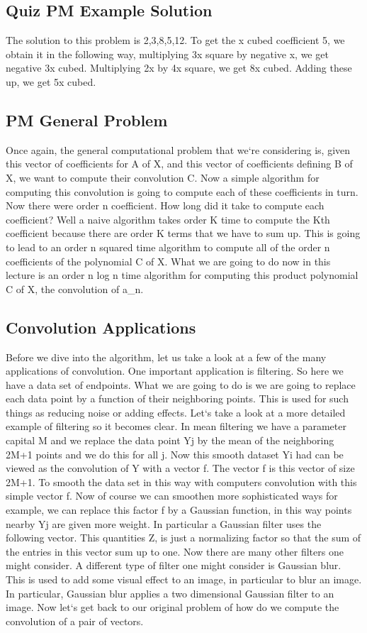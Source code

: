 \subsection{Quiz  PM  Example Solution}
The solution to this problem is 2,3,8,5,12.
To get the x cubed coefficient 5, we obtain it in the following way, multiplying 3x square by negative x, we get negative 3x cubed.
Multiplying 2x by 4x square, we get 8x cubed.
Adding these up, we get 5x cubed.

\subsection{PM  General Problem}
Once again, the general computational problem that we`re considering is, given this vector of coefficients for A of X, and this vector of coefficients defining B of X, we want to compute their convolution C\@.
Now a simple algorithm for computing this convolution is going to compute each of these coefficients in turn.
Now there were order n coefficient.
How long did it take to compute each coefficient? Well a naive algorithm takes order K time to compute the Kth coefficient because there are order K terms that we have to sum up.
This is going to lead to an order n squared time algorithm to compute all of the order n coefficients of the polynomial C of X\@.
What we are going to do now in this lecture is an order n log n time algorithm for computing this product polynomial C of X, the convolution of a\_n.

\subsection{Convolution Applications}
Before we dive into the algorithm, let us take a look at a few of the many applications of convolution.
One important application is filtering.
So here we have a data set of endpoints.
What we are going to do is we are going to replace each data point by a function of their neighboring points.
This is used for such things as reducing noise or adding effects.
Let`s take a look at a more detailed example of filtering so it becomes clear.
In mean filtering we have a parameter capital M and we replace the data point Yj by the mean of the neighboring 2M+1 points and we do this for all j.
Now this smooth dataset Yi had can be viewed as the convolution of Y with a vector f.
The vector f is this vector of size 2M+1.
To smooth the data set in this way with computers convolution with this simple vector f.
Now of course we can smoothen more sophisticated ways for example, we can replace this factor f by a Gaussian function, in this way points nearby Yj are given more weight.
In particular a Gaussian filter uses the following vector.
This quantities Z, is just a normalizing factor so that the sum of the entries in this vector sum up to one.
Now there are many other filters one might consider.
A different type of filter one might consider is Gaussian blur.
This is used to add some visual effect to an image, in particular to blur an image.
In particular, Gaussian blur applies a two dimensional Gaussian filter to an image.
Now let`s get back to our original problem of how do we compute the convolution of a pair of vectors.

